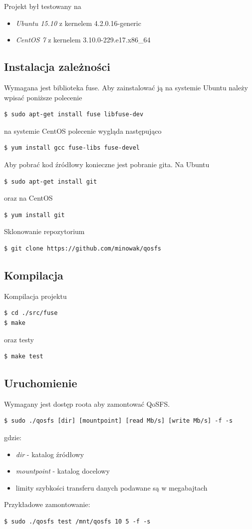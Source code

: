 Projekt był testowany na 
\begin{itemize}
\item \emph{Ubuntu 15.10} z kernelem 4.2.0.16-generic
\item \emph{CentOS 7} z kernelem 3.10.0-229.e17.x86\_64
\end{itemize}

\subsection{Instalacja zależności}
Wymagana jest biblioteka fuse.
Aby zainstalować ją na systemie Ubuntu należy wpisać poniższe polecenie
\begin{verbatim}
$ sudo apt-get install fuse libfuse-dev
\end{verbatim}
na systemie CentOS polecenie wygląda następująco
\begin{verbatim}
$ yum install gcc fuse-libs fuse-devel
\end{verbatim}

\noindent Aby pobrać kod źródłowy konieczne jest pobranie gita. 
Na Ubuntu
\begin{verbatim}
$ sudo apt-get install git
\end{verbatim}
oraz na CentOS
\begin{verbatim}
$ yum install git
\end{verbatim}

\noindent Sklonowanie repozytorium

\begin{verbatim}
$ git clone https://github.com/minowak/qosfs
\end{verbatim}

\subsection{Kompilacja}
Kompilacja projektu
\begin{verbatim}
$ cd ./src/fuse
$ make
\end{verbatim}
\noindent oraz testy
\begin{verbatim}
$ make test
\end{verbatim}
\subsection{Uruchomienie}
Wymagany jest dostęp roota aby zamontować QoSFS.
\begin{verbatim}
$ sudo ./qosfs [dir] [mountpoint] [read Mb/s] [write Mb/s] -f -s
\end{verbatim}
gdzie:
\begin{itemize}
\item \emph{dir} - katalog źródłowy
\item \emph{mountpoint} - katalog docelowy
\item limity szybkości transferu danych podawane są w megabajtach
\end{itemize}
Przykładowe zamontowanie:
\begin{verbatim}
$ sudo ./qosfs test /mnt/qosfs 10 5 -f -s
\end{verbatim}
